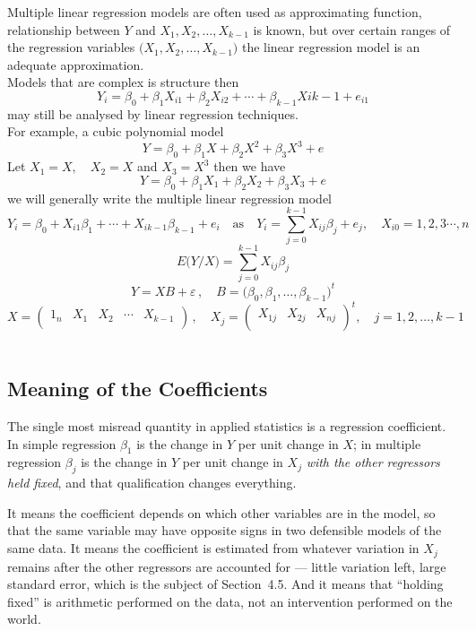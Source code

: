 \documentclass[11pt,a4paper]{article}
\theoremstyle{definition}
\begin{document}
Multiple linear regression models are often used as approximating function, relationship between $Y$ and $X_1,X_2,\ldots ,X_{k-1}$ is known, but over certain ranges of the regression variables $\big(X_1,X_2,\ldots ,X_{k-1}\big)$ the linear regression model is an adequate approximation.\\
Models that are complex is  structure then $$Y_i=\beta_0+\beta_1X_{i1}+\beta_2X_{i2}+\cdots + \beta_{k-1}X{ik-1}+e_{i1}$$ may still be analysed by linear regression techniques.\\

For example, a cubic polynomial model $$ Y=\beta_0+\beta_1X+\beta_2X^2+\beta_3X^3+e$$
Let $X_1=X,\quad  X_2=X$ and $X_3=X^3$ then we have  
$$Y=\beta_0+\beta_1X_1+\beta_2X_2+\beta_3X_3+e$$
we will generally write the multiple linear regression model $$Y_i=\beta_0+X_{i1}\beta_1+\cdots + X_{ik-1}\beta_{k-1}+e_i\quad  \text{as}\quad  Y_i=\sum^{k-1}_{j=0}X_{ij}\beta_j+e_j,\quad  X_{i0}=1,2,3\cdots ,n$$
$$E\big(Y/X\big)=\sum^{k-1}_{j=0}X_{ij}\beta_j$$
$$Y=XB+\varepsilon\,,\quad  B=\big(\beta_0,\beta_1,\ldots ,\beta_{k-1}\big)^t$$
$$X=
\begin{pmatrix}
1_n & X_1 & X_2 & \cdots & X_{k-1}\\
\end{pmatrix}
\,,\quad  X_j=
\begin{pmatrix}
X_{1j} & X_{2j} & X_{nj}\\
\end{pmatrix}^t,\quad 
j=1,2,\ldots ,k-1
$$\\


\subsection{Meaning of the Coefficients}
The single most misread quantity in applied statistics is a regression
coefficient. In simple regression $\beta_1$ is the change in $Y$ per unit
change in $X$; in multiple regression $\beta_j$ is the change in $Y$ per unit
change in $X_j$ \emph{with the other regressors held fixed}, and that
qualification changes everything.

It means the coefficient depends on which other variables are in the model, so
that the same variable may have opposite signs in two defensible models of the
same data. It means the coefficient is estimated from whatever variation in
$X_j$ remains after the other regressors are accounted for --- little variation
left, large standard error, which is the subject of Section~4.5. And it means
that ``holding fixed'' is arithmetic performed on the data, not an intervention
performed on the world.
\end{document}
